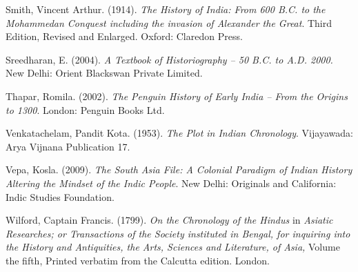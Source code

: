 \begin{thebibliography}{99}
  Smith, Vincent Arthur. (1914). \textit{The History of India: From 600 B.C. to the Mohammedan Conquest including the invasion of Alexander the Great}. Third Edition, Revised and Enlarged. Oxford: Claredon Press.

  Sreedharan, E. (2004). \textit{A Textbook of Historiography – 50 B.C. to A.D. 2000.} New Delhi: Orient Blackswan Private Limited.

  Thapar, Romila. (2002). \textit{The Penguin History of Early India – From the Origins to 1300}. London: Penguin Books Ltd.

  Venkatachelam, Pandit Kota. (1953). \textit{The Plot in Indian Chronology}. Vijayawada: Arya Vijnana Publication 17.

  Vepa, Kosla. (2009). \textit{The South Asia File: A Colonial Paradigm of Indian History Altering the Mindset of the Indic People}. New Delhi: Originals and California: Indic Studies Foundation.

  Wilford, Captain Francis. (1799). \textit{On the Chronology of the Hindus} in \textit{Asiatic Researches; or Transactions of the Society instituted in Bengal, for inquiring into the History and Antiquities, the Arts, Sciences and Literature, of Asia,} Volume the fifth, Printed verbatim from the Calcutta edition. London.
 
 \end{thebibliography}


